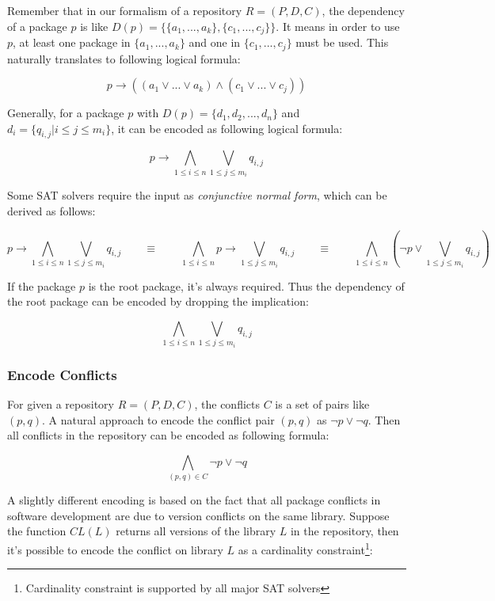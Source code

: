 Remember that in our formalism of a repository $R = (P, D, C)$, the dependency of a package $p$ is like $D(p) = \{\{a_1, ..., a_k\}, \{c_1, ..., c_j\}\}$. It means in order to use $p$, at least one package in $\{a_1, ..., a_k\}$ and one in $\{c_1, ..., c_j\}$ must be used. This naturally translates to following logical formula:

\[
p \rightarrow ((a_1 \vee ... \vee a_k) \wedge (c_1 \vee ... \vee c_j))
\]

Generally, for a package $p$ with $D(p) = \{ d_1, d_2, ..., d_n\}$ and $d_i = \{ q_{i, j} | i \leq j \leq m_i \}$, it can be encoded as following logical formula:

\[
p \rightarrow \bigwedge_{1 \leq i \leq n} \bigvee_{1 \leq j \leq m_i} q_{i,j}
\]

Some SAT solvers require the input as \emph{conjunctive normal form}, which can be derived as follows:

\[
p \rightarrow \bigwedge_{1 \leq i \leq n} \bigvee_{1 \leq j \leq m_i} q_{i,j}
\quad \quad \equiv \quad \quad
\bigwedge_{1 \leq i \leq n} p \rightarrow \bigvee_{1 \leq j \leq m_i} q_{i,j}
\quad \quad \equiv \quad \quad
\bigwedge_{1 \leq i \leq n} (\neg p \vee \bigvee_{1 \leq j \leq m_i} q_{i,j})
\]

If the package $p$ is the root package, it's always required. Thus the dependency of the root package can be encoded by dropping the implication:

\[
\bigwedge_{1 \leq i \leq n} \bigvee_{1 \leq j \leq m_i} q_{i,j}
\]

\subsubsection{Encode Conflicts}

For given a repository $R = (P, D, C)$, the conflicts $C$ is a set of pairs like $(p, q)$. A natural approach to encode the conflict pair $(p, q)$ as $\neg p \vee \neg q$. Then all conflicts in the repository can be encoded as following formula:

\[
\bigwedge_{(p, q) \in C} \neg p \vee \neg q
\]

A slightly different encoding is based on the fact that all package conflicts in software development are due to version conflicts on the same library. Suppose the function $CL(L)$ returns all versions of the library $L$ in the repository, then it's possible to encode the conflict on library $L$ as a cardinality constraint\footnote{Cardinality constraint is supported by all major SAT solvers}:

